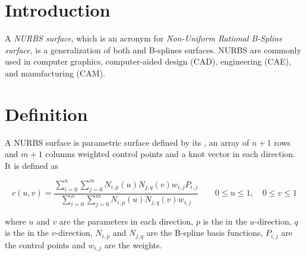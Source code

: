 \documentclass[12pt]{article}
\begin{document}
\section{Introduction}
A \emph{NURBS surface}, which is an acronym for \emph{Non-Uniform Rational B-Spline surface}, is a generalization of both  and B-splines surfaces. NURBS are commonly used in computer graphics, computer-aided design (CAD), engineering (CAE), and manufacturing (CAM).

\section{Definition}
A NURBS surface is parametric surface defined by its , an array of $n+1$ rows and $m+1$ columns weighted control points and a knot vector in each direction. It is defined as

\[
c(u,v) = \frac { \sum_{i=0}^{n}\sum_{j=0}^{m} N_{i,p}(u)N_{j,q}(v) w_{i,j} P_{i,j}} { \sum_{i=0}^{n}\sum_{j=0}^{m} N_{i,p}(u)N_{j,q}(v) w_{i,j}} \quad \quad 0 \leq u \leq 1, \quad 0 \leq v \leq 1
\]

where $u$ and $v$ are the parameters in each direction, $p$ is the  in the $u$-direction, $q$ is the  in the $v$-direction, $N_{i,p}$ and $N_{j,q}$ are the B-spline basis functions, $P_{i,j}$ are the control points and $w_{i,j}$ are the weights.
\end{document}
